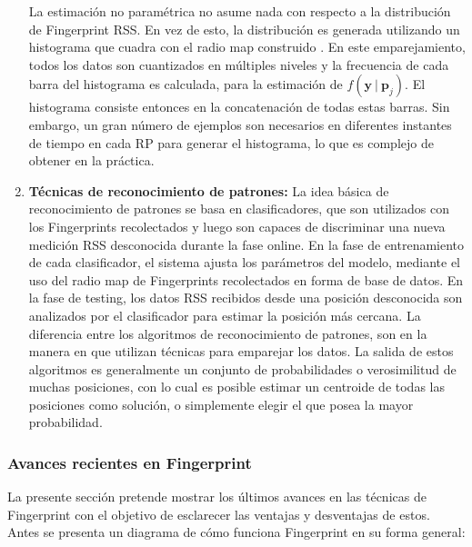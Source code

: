 \begin{enumerate}
La estimación no paramétrica no asume nada con respecto a la distribución de Fingerprint RSS. En vez de esto, la distribución es generada utilizando un histograma que cuadra con el radio map construido \citep{Haeberlen:2004:PRL:1023720.1023728, Ladd:2002:RLS:570645.570674}. En este emparejamiento, todos los datos son cuantizados en múltiples niveles y la frecuencia de cada barra del histograma es calculada, para la estimación de \(f( \textbf{y} \ \vert \ \textbf{p}_{j} ) \). El histograma consiste entonces en la concatenación de todas estas barras. Sin embargo, un gran número de ejemplos son necesarios en diferentes instantes de tiempo en cada RP para generar el histograma, lo que es complejo de obtener en la práctica.

\item \textbf{Técnicas de reconocimiento de patrones:} La idea básica de reconocimiento de patrones se basa en clasificadores, que son utilizados con los Fingerprints recolectados y luego son capaces de discriminar una nueva medición RSS desconocida durante la fase online. En la fase de entrenamiento de cada clasificador, el sistema ajusta los parámetros del modelo, mediante el uso del radio map de Fingerprints recolectados en forma de base de datos. En la fase de testing, los datos RSS recibidos desde una posición desconocida son analizados por el clasificador para estimar la posición más cercana. La diferencia entre los algoritmos de reconocimiento de patrones, son en la manera en que utilizan técnicas para emparejar los datos. La salida de estos algoritmos es generalmente un conjunto de probabilidades o verosimilitud de muchas posiciones, con lo cual es posible estimar un centroide de todas las posiciones como solución, o simplemente elegir el que posea la mayor probabilidad.
\end{enumerate}

\subsubsection{Avances recientes en Fingerprint}

La presente sección pretende mostrar los últimos avances en las técnicas de Fingerprint con el objetivo de esclarecer las ventajas y desventajas de estos. Antes se presenta un diagrama de cómo funciona Fingerprint en su forma general:

